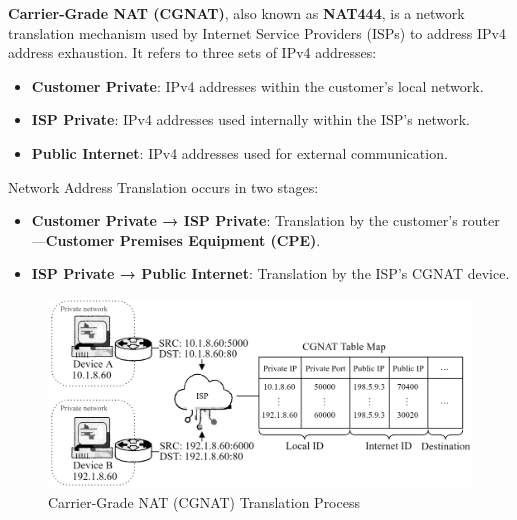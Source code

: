 \begin{Def}

    \textbf{Carrier-Grade NAT (CGNAT)}, also known as \textbf{NAT444}, is a network translation mechanism used by Internet Service Providers (ISPs) to address IPv4 address exhaustion. It refers to three sets of IPv4 addresses:
    \begin{itemize}
        \item \textbf{Customer Private}: IPv4 addresses within the customer's local network.
        \item \textbf{ISP Private}: IPv4 addresses used internally within the ISP's network.
        \item \textbf{Public Internet}: IPv4 addresses used for external communication.
    \end{itemize}
    
    Network Address Translation occurs in two stages:
    \begin{itemize}
        \item \textbf{Customer Private → ISP Private}: Translation by the customer's router---\textbf{Customer Premises Equipment (CPE)}.
        \item \textbf{ISP Private → Public Internet}: Translation by the ISP's CGNAT device.
    \end{itemize}

    \hfill \cite{rfc2663}\cite{rbfs_cgnat}
    
\end{Def}
    
\newpage

\begin{figure}[h!]
    \hspace{-2.5em}
    \includegraphics[width=1.1\textwidth]{Sections/network/cgnat.png}
    \caption{Carrier-Grade NAT (CGNAT) Translation Process}
    \label{fig:cgnat}
\end{figure}

